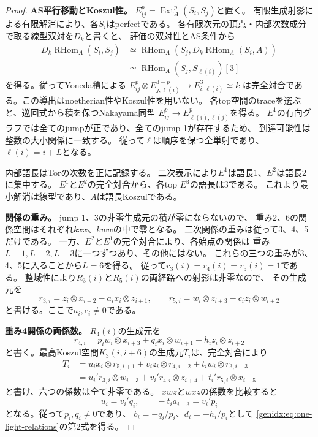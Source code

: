\documentclass[11pt,a4paper]{ltjsarticle}
\theoremstyle{definition}
\newcommand{\Ext}{\operatorname{Ext}}
\begin{document}
\begin{proof}
\par\smallskip\noindent\textbf{AS平行移動とKoszul性。}\quad
$E_{ij}^p=\Ext_A^p(S_i,S_j)$と置く。
有限生成射影による有限解消により、各$S_i$はperfectである。
各有限次元の頂点・内部次数成分で取る線型双対を$D_k$と書くと、
評価の双対性とAS条件から
\[
\begin{aligned}
D_k\operatorname{RHom}_A(S_i,S_j)
&\simeq\operatorname{RHom}_A
 (S_j,D_k\operatorname{RHom}_A(S_i,A))\\
&\simeq\operatorname{RHom}_A(S_j,S_{\ell(i)})[3]
\end{aligned}
\]
を得る。従ってYoneda積による
$E_{ij}^p\otimes E_{j,\ell(i)}^{3-p}\to E_{i,\ell(i)}^3\simeq k$
は完全対合である。この導出はnoetherian性やKoszul性を用いない。
各top空間のtraceを選ぶと、巡回式から積を保つNakayama同型
$E_{ij}^p\to E_{\ell(i),\ell(j)}^p$を得る。
$E^1$の有向グラフでは全てのjumpが正であり、全てのjump 1が存在するため、
到達可能性は整数の大小関係に一致する。
従って$\ell$は順序を保つ全単射であり、$\ell(i)=i+L$となる。

内部語長はTorの次数を正に記録する。
二次表示により$E^1$は語長1、$E^2$は語長2に集中する。
$E^1$と$E^2$の完全対合から、各top $E^3$の語長は3である。
これより最小解消は線型であり、$A$は語長Koszulである。

\par\smallskip\noindent\textbf{関係の重み。}\quad
jump 1、3の非零生成元の積が零にならないので、
重み2、6の関係空間はそれぞれ$kxx$、$kww$の中で零となる。
二次関係の重みは従って3、4、5だけである。
一方、$E^2$と$E^1$の完全対合により、各始点の関係は
重み$L-1,L-2,L-3$に一つずつあり、その他にはない。
これらの三つの重みが3、4、5に入ることから$L=6$を得る。
従って$r_3(i)=r_4(i)=r_5(i)=1$である。
整域性により$R_3(i)$と$R_5(i)$の両経路への射影は非零なので、
その生成元を
\[
r_{3,i}=z_i\otimes x_{i+2}-a_i x_i\otimes z_{i+1},\qquad
r_{5,i}=w_i\otimes z_{i+3}-c_i z_i\otimes w_{i+2}
\]
と書ける。ここで$a_i,c_i\ne0$である。

\par\smallskip\noindent\textbf{重み4関係の両係数。}\quad
$R_4(i)$の生成元を
\[
r_{4,i}=p_i w_i\otimes x_{i+3}
       +q_i x_i\otimes w_{i+1}+h_i z_i\otimes z_{i+2}
\]
と書く。最高Koszul空間$K_3(i,i+6)$の生成元$T_i$は、完全対合により
\begin{align*}
T_i&=u_i x_i\otimes r_{5,i+1}
     +v_i z_i\otimes r_{4,i+2}+t_i w_i\otimes r_{3,i+3}\\
&=u_i' r_{3,i}\otimes w_{i+3}
     +v_i' r_{4,i}\otimes z_{i+4}+t_i' r_{5,i}\otimes x_{i+5}
\end{align*}
と書け、六つの係数は全て非零である。
$xwz$と$wxz$の係数を比較すると
\[
u_i=v_i'q_i,\qquad -t_i a_{i+3}=v_i'p_i
\]
となる。従って$p_i,q_i\ne0$であり、
$b_i=-q_i/p_i$、$d_i=-h_i/p_i$として
\eqref{genidx:eq:one-light-relations}の第2式を得る。


\end{proof}
\end{document}
